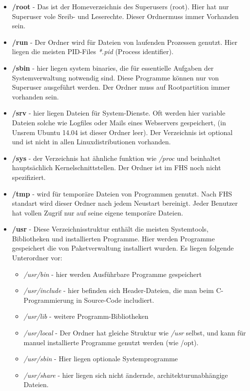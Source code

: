 \begin{itemize}
\begin{itemize}
			\item \textbf{/root} - Das ist der Homeverzeichnis des Superusers (root).
			Hier hat nur Superuser vole Sreib- und Leserechte.
			Dieser Ordnermuss immer Vorhanden sein.
			\item \textbf{/run} - Der Ordner wird für Dateien von laufenden Prozessen genutzt.
			Hier liegen die meisten PID-Files \textit{*.pid} (Process identifier).
			\item \textbf{/sbin } - hier liegen system binaries, die für essentielle Aufgaben der Systemverwaltung
			notwendig sind. Diese Programme können nur von Superuser ausgeführt werden.
			Der Ordner muss auf Rootpartition immer vorhanden sein.
			\item \textbf{/srv }- hier liegen Dateien für  System-Dienste.
			Oft werden hier variable Dateien solche wie Logfiles oder Mails  eines Webservers gespeichert,
			(in Unsrem Ubuntu 14.04 ist dieser Ordner leer).
			Der Verzeichnis ist optional und ist nicht in allen Linuxdistributionen vorhanden.
			\item \textbf{/sys} - der Verzeichnis hat ähnliche funktion wie \textit{/proc} und beinhaltet
 			hauptsächlich Kernelschnittstellen.
		  Der Ordner ist im FHS noch nicht spezifiziert.
			\item \textbf{/tmp} - wird für temporäre Dateien von Programmen genutzt.
			Nach FHS standart wird dieser Ordner nach jedem Neustart bereinigt.
			Jeder Benutzer hat vollen Zugrif nur auf seine eigene temporäre Dateien.
			\item \textbf{/usr} - Diese Verzeichnisstruktur enthält die meisten Systemtools, Bibliotheken und installierten Programme.
			Hier werden Programme gespeichert die von Paketverwaltung installiert wurden.
			Es liegen folgende Unterordner vor:
			\begin{itemize}
				\item \textit{/usr/bin} - hier werden Ausführbare Programme gespeichert
				\item \textit{/usr/include} - hier befinden sich Header-Dateien, die man beim C-Programmierung
				in Source-Code includiert.
				\item \textit{/usr/lib} - weitere Programm-Bibliotheken
				\item \textit{/usr/local} - Der Ordner hat gleiche Struktur wie \textit{/usr} selbst, und kann
				für manuel installierte Programme genutzt werden (wie /opt).
				\item \textit{/usr/sbin} - Hier liegen optionale Systemprogramme
				\item \textit{/usr/share} - hier liegen sich nicht ändernde, architekturunabhängige Dateien.

\end{itemize}
\end{itemize}
\end{itemize}
